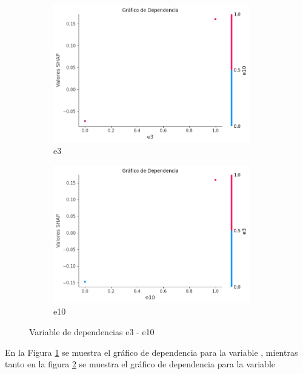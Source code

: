 \begin{figure}[H]

    \begin{subfigure}{0.5\textwidth}
        \includegraphics[width=0.9\linewidth, height=6cm]{img/shap_lr/e3.png}
        \caption{e3}
        \label{fig:dependencia_e3_lr}
    \end{subfigure}
    \begin{subfigure}{0.5\textwidth}
        \includegraphics[width=0.9\linewidth, height=6cm]{img/shap_lr/e10.png}
        \caption{e10}
        \label{fig:dependencia_e10_lr}
    \end{subfigure}

    \caption{Variable de dependencias e3 - e10}
    \label{fig:image2}
\end{figure}

En la Figura \ref{fig:dependencia_e3_lr} se muestra el gráfico de dependencia para la variable , mientras tanto en la figura \ref{fig:dependencia_e10_lr} se muestra el gráfico de dependencia para la variable 

